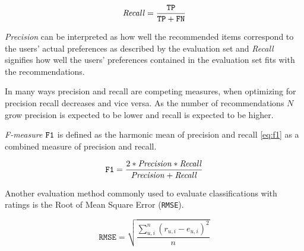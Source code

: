 \begin{equation} \label{eq:recall}
    \mathit{Recall} = \frac{\mathtt{TP}}{\mathtt{TP} + \mathtt{FN}}
\end{equation}

\textit{Precision} can be interpreted as how well the recommended items correspond to the users' actual preferences as described by the evaluation set and \textit{Recall} signifies how well the users' preferences contained in the evaluation set fits with the recommendations.

In many ways precision and recall are competing measures, when optimizing for precision recall decreases and vice versa.  As the number of recommendations $N$ grow precision is expected to be lower and recall is expected to be higher. \citep{hu2008collaborative}

\textit{F-measure} $\mathtt{F1}$ is defined as the harmonic mean of precision and recall \eqref{eq:f1} as a combined measure of precision and recall.

\begin{equation} \label{eq:f1}
    \mathtt{F1} = \frac{2 * \mathit{Precision} * \mathit{Recall}}{\mathit{Precision} + \mathit{Recall}}
\end{equation}

Another evaluation method commonly used to evaluate classifications with ratings is the Root of Mean Square Error (\texttt{RMSE}).
\citep{bobadilla2013recommender}

\begin{equation} \label{eq:rmse}
    \mathtt{RMSE} = \sqrt{\frac{\sum_{u, i}^n (r_{u, i} - e_{u, i})^2}{n}}
\end{equation}

